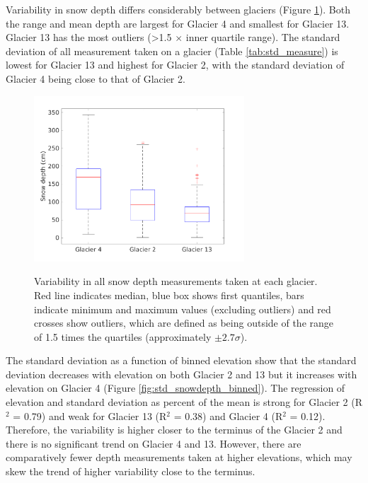 \documentclass{sfuthesis}
\begin{document}
{\begin{appendices}
Variability in snow depth differs considerably between glaciers (Figure \ref{fig:box_depth}). Both the range and mean depth are largest for Glacier 4 and smallest for Glacier 13. Glacier 13 has the most outliers (\textgreater 1.5 $\times$ inner quartile range). The standard deviation of all measurement taken on a glacier (Table \ref{tab:std_measure}) is lowest for Glacier 13 and highest for Glacier 2, with the standard deviation of Glacier 4 being close to that of Glacier 2. 


\begin{figure} 
\centering
	\includegraphics[width = 0.7\textwidth]{box_depth.png}\\
	\caption[]{Variability in all snow depth measurements taken at each glacier. Red line indicates median, blue box shows first quantiles, bars indicate minimum and maximum values (excluding outliers) and red crosses show outliers, which are defined as being outside of the range of 1.5 times the quartiles (approximately $\pm2.7\sigma$).}
	\label{fig:box_depth}
\end{figure}

The standard deviation as a function of binned elevation show that the standard deviation decreases with elevation on both Glacier 2 and 13 but it increases with elevation on Glacier 4 (Figure \ref{fig:std_snowdepth_binned}). The regression of elevation and standard deviation as percent of the mean is strong for Glacier 2 (R$^2$ = 0.79) and weak for Glacier 13 (R$^2$ = 0.38) and Glacier 4 (R$^2$ = 0.12). Therefore, the variability is higher closer to the terminus of the Glacier 2 and there is no significant trend on Glacier 4 and 13. However, there are comparatively fewer depth measurements taken at higher elevations, which may skew the trend of higher variability close to the terminus. 


\end{appendices}}
\end{document}
